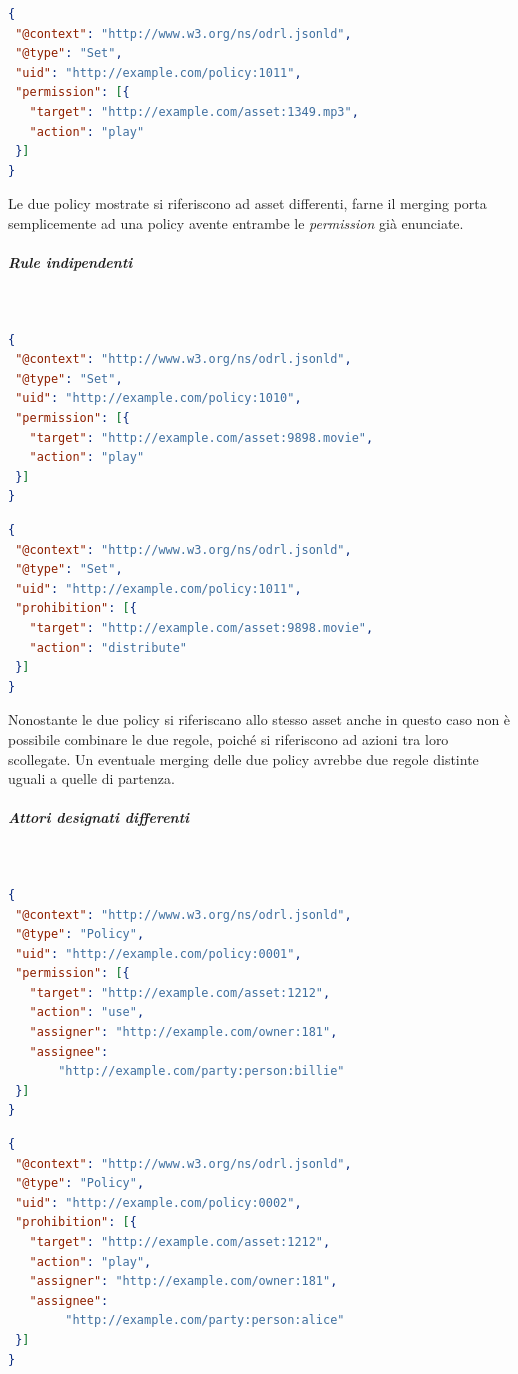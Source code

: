 \documentclass[12pt,a4paper,twoside]{book}
\begin{document}
\begin{lstlisting}[language=json,firstnumber=1,caption={La policy 1011 consente la riproduzione dell'asset 1349.mp3 a chiunque},captionpos=b]
{
 "@context": "http://www.w3.org/ns/odrl.jsonld",
 "@type": "Set",
 "uid": "http://example.com/policy:1011",
 "permission": [{
   "target": "http://example.com/asset:1349.mp3",
   "action": "play"
 }]
}
\end{lstlisting}
Le due policy mostrate si riferiscono ad asset differenti, farne il merging porta semplicemente ad una policy avente entrambe le \textit{permission} già enunciate.
\subparagraph{Rule indipendenti}\mbox{}\\
\begin{lstlisting}[language=json,firstnumber=1,caption={La policy 1010 consente la riproduzione dell'asset 9898.movie a chiunque},captionpos=b]
{
 "@context": "http://www.w3.org/ns/odrl.jsonld",
 "@type": "Set",
 "uid": "http://example.com/policy:1010",
 "permission": [{
   "target": "http://example.com/asset:9898.movie",
   "action": "play"
 }]
}
\end{lstlisting}
\begin{lstlisting}[language=json,firstnumber=1,caption={La policy 1011 proibisce la distribuzione dell'asset 9898.movie a chiunque},captionpos=b]
{
 "@context": "http://www.w3.org/ns/odrl.jsonld",
 "@type": "Set",
 "uid": "http://example.com/policy:1011",
 "prohibition": [{
   "target": "http://example.com/asset:9898.movie",
   "action": "distribute"
 }]
}
\end{lstlisting}
Nonostante le due policy si riferiscano allo stesso asset anche in questo caso non è possibile combinare le due regole, poiché si riferiscono ad azioni tra loro scollegate. Un eventuale merging delle due policy avrebbe due regole distinte uguali a quelle di partenza.\newpage
\subparagraph{Attori designati differenti}\mbox{}\\
\begin{lstlisting}[language=json,firstnumber=1,caption={La policy 0001 permette un qualsiasi utilizzo dell'asset 1212 da parte del soggetto Billie},captionpos=b]
{
 "@context": "http://www.w3.org/ns/odrl.jsonld",
 "@type": "Policy",
 "uid": "http://example.com/policy:0001",
 "permission": [{
   "target": "http://example.com/asset:1212",
   "action": "use",
   "assigner": "http://example.com/owner:181",
   "assignee": 
	   "http://example.com/party:person:billie"
 }]
}
\end{lstlisting}
\begin{lstlisting}[language=json,firstnumber=1,caption={La policy 0002 proibisce la riproduzione dell'asset 1212 da parte del soggetto Alice},captionpos=b]
{
 "@context": "http://www.w3.org/ns/odrl.jsonld",
 "@type": "Policy",
 "uid": "http://example.com/policy:0002",
 "prohibition": [{
   "target": "http://example.com/asset:1212",
   "action": "play",
   "assigner": "http://example.com/owner:181",
   "assignee": 
        "http://example.com/party:person:alice"
 }]
}
\end{lstlisting}
\end{document}

